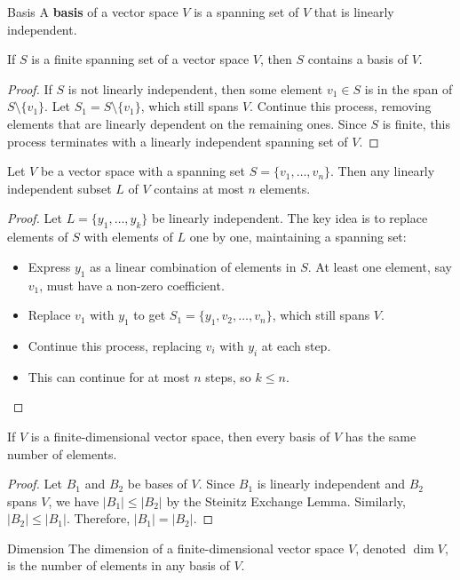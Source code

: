 \documentclass[a4paper, 9pt]{extarticle}
\begin{document}
\begin{definitionbox}{Basis}{}
  A \textbf{basis} of a vector space $V$ is a spanning set of $V$ that is linearly independent.
\end{definitionbox}

\begin{lemmabox}{}{}
  If $S$ is a finite spanning set of a vector space $V$, then $S$ contains a basis of $V$.
\end{lemmabox}

\begin{proof}
  If $S$ is not linearly independent, then some element $v_1 \in S$ is in the span of $S \setminus \{v_1\}$. Let $S_1 = S \setminus \{v_1\}$, which still spans $V$. Continue this process, removing elements that are linearly dependent on the remaining ones. Since $S$ is finite, this process terminates with a linearly independent spanning set of $V$.
\end{proof}

\begin{theorembox}{}
  Let $V$ be a vector space with a spanning set $S = \{v_1, \ldots, v_n\}$. Then any linearly independent subset $L$ of $V$ contains at most $n$ elements.
\end{theorembox}

\begin{proof}
  Let $L = \{y_1, \ldots, y_k\}$ be linearly independent. The key idea is to replace elements of $S$ with elements of $L$ one by one, maintaining a spanning set:
  \begin{itemize}
    \item Express $y_1$ as a linear combination of elements in $S$. At least one element, say $v_1$, must have a non-zero coefficient.
    \item Replace $v_1$ with $y_1$ to get $S_1 = \{y_1, v_2, \ldots, v_n\}$, which still spans $V$.
    \item Continue this process, replacing $v_i$ with $y_i$ at each step.
    \item This can continue for at most $n$ steps, so $k \leq n$.
  \end{itemize}
\end{proof}

\begin{theorembox}
  If $V$ is a finite-dimensional vector space, then every basis of $V$ has the same number of elements.
\end{theorembox}

\begin{proof}
  Let $B_1$ and $B_2$ be bases of $V$. Since $B_1$ is linearly independent and $B_2$ spans $V$, we have $|B_1| \leq |B_2|$ by the Steinitz Exchange Lemma. Similarly, $|B_2| \leq |B_1|$. Therefore, $|B_1| = |B_2|$.
\end{proof}

\begin{definitionbox}{Dimension}{}
  The dimension of a finite-dimensional vector space $V$, denoted $\dim V$, is the number of elements in any basis of $V$.
\end{definitionbox}
\end{document}
